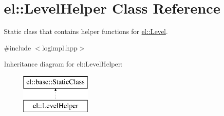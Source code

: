 \hypertarget{classel_1_1LevelHelper}{\section{el\-:\-:Level\-Helper Class Reference}
\label{classel_1_1LevelHelper}
}


Static class that contains helper functions for \hyperlink{namespaceel_ab0ac6091262344c52dd2d3ad099e8e36}{el\-::\-Level}.  




{\ttfamily \#include $<$logimpl.\-hpp$>$}

Inheritance diagram for el\-:\-:Level\-Helper\-:\begin{figure}[H]
\begin{center}
\leavevmode
\includegraphics[height=2.000000cm]{classel_1_1LevelHelper}
\end{center}
\end{figure}
